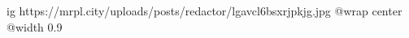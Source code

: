  
 
 
 
 

\ifcmt
  ig https://mrpl.city/uploads/posts/redactor/lgavcl6bsxrjpkjg.jpg
  @wrap center
  @width 0.9
\fi
